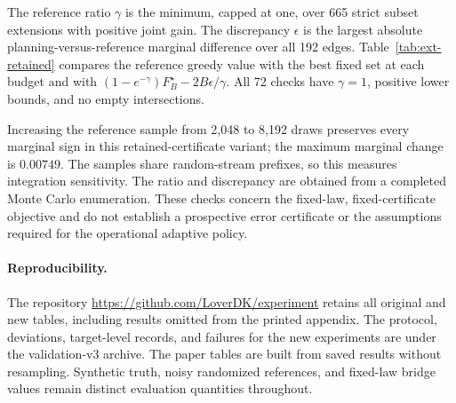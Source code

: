 The reference ratio $\gamma$ is the minimum, capped at one, over 665 strict subset extensions with positive joint gain. The discrepancy $\epsilon$ is the largest absolute planning-versus-reference marginal difference over all 192 edges. Table~\ref{tab:ext-retained} compares the reference greedy value with the best fixed set at each budget and with $(1-e^{-\gamma})F_B^\star-2B\epsilon/\gamma$. All 72 checks have $\gamma=1$, positive lower bounds, and no empty intersections.


Increasing the reference sample from 2,048 to 8,192 draws preserves every marginal sign in this retained-certificate variant; the maximum marginal change is $0.00749$. The samples share random-stream prefixes, so this measures integration sensitivity. The ratio and discrepancy are obtained from a completed Monte Carlo enumeration. These checks concern the fixed-law, fixed-certificate objective and do not establish a prospective error certificate or the assumptions required for the operational adaptive policy.

\paragraph{Reproducibility.}
The repository \url{https://github.com/LoverDK/experiment} retains all original and new tables, including results omitted from the printed appendix. The protocol, deviations, target-level records, and failures for the new experiments are under the validation-v3 archive. The paper tables are built from saved results without resampling. Synthetic truth, noisy randomized references, and fixed-law bridge values remain distinct evaluation quantities throughout.
